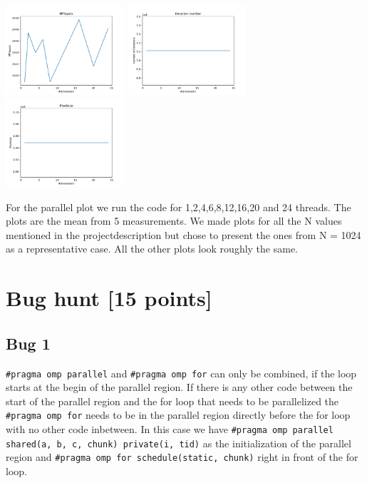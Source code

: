 \documentclass[unicode,11pt,a4paper,oneside,numbers=endperiod,openany]{scrartcl}
\begin{document}
\includegraphics[width=0.33\textwidth]{../results/MFLops.pdf}
\includegraphics[width=0.33\textwidth]{../results/iterationnumber.pdf}
\includegraphics[width=0.33\textwidth]{../results/pixelsize.pdf}

For the parallel plot we run the code for 1,2,4,6,8,12,16,20 and 24 threads. The plots are the mean from 5 measurements.
We made plots for all the N values mentioned in the projectdescription but chose to present the ones from N = 1024 as a representative case. All the other plots look roughly the same.


\section{Bug hunt [15 points]}

\subsection{Bug 1}
\texttt{\#pragma omp parallel} and \texttt{\#pragma omp for} can only be combined, if the loop starts at the begin of the parallel region.
If there is any other code between the start of the parallel region and the for loop that needs to be parallelized
the \texttt{\#pragma omp for} needs to be in the parallel region directly before the for loop with no other code inbetween.
In this case we have \texttt{\#pragma omp parallel shared(a, b, c, chunk) private(i, tid)} as the initialization of the parallel region and 
\texttt{\#pragma omp for schedule(static, chunk)} right in front of the for loop.
\end{document}
